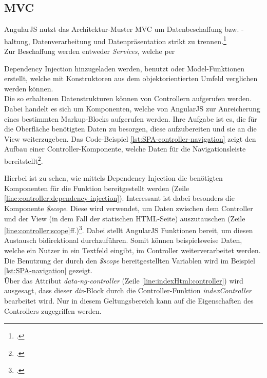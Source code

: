 \subsection{MVC}
\label{ssec:SPA-MVC}
AngularJS nutzt das Architektur-Muster \ac{MVC} um Datenbeschaffung bzw. -haltung, Datenverarbeitung und Datenpräsentation strikt zu trennen.\footcite[S.34]{book:AngularJs:Steyer2015} \\ 
Zur Beschaffung werden entweder \textit{Services}, welche per {Dependency Injection hinzugeladen werden, benutzt oder Model-Funktionen erstellt, welche mit Konstruktoren aus dem objektorientierten Umfeld verglichen werden können. \\
Die so erhaltenen Datenstrukturen können von Controllern aufgerufen werden. Dabei handelt es sich um Komponenten, welche von AngularJS zur Anreicherung eines bestimmten \gls{Markup}-Blocks aufgerufen werden. Ihre Aufgabe ist es, die für die Oberfläche benötigten Daten zu besorgen, diese aufzubereiten und sie an die View weiterzugeben. Das Code-Beispiel \ref{lst:SPA-controller-navigation} zeigt den Aufbau einer Controller-Komponente, welche Daten für die Navigationsleiste bereitstellt\footcite{online:angular:controller}.

Hierbei ist zu sehen, wie mittels Dependency Injection die benötigten Komponenten für die Funktion bereitgestellt werden (Zeile \ref{line:controller:dependency-injection}). Interessant ist dabei besonders die Komponente \textit{\$scope}. Diese wird verwendet, um Daten zwischen dem Controller und der View (in dem Fall der statischen HTML-Seite) auszutauschen (Zeile \ref{line:controller:scope}ff.)\footcite{online:angular:scopes}. Dabei stellt AngularJS Funktionen bereit, um diesen Austausch bidirektional durchzuführen. Somit können beispielsweise Daten, welche ein Nutzer in ein Textfeld eingibt, im Controller weiterverarbeitet werden.\\
Die Benutzung der durch den \textit{\$scope} bereitgestellten Variablen wird im Beispiel \ref{lst:SPA-navigation} gezeigt.\\

Über das Attribut \textit{data-ng-controller} (Zeile \ref{line:indexHtml:controller}) wird ausgesagt, dass dieser \textit{div}-Block durch die Controller-Funktion \textit{indexController} bearbeitet wird. Nur in diesem Geltungsbereich kann auf die Eigenschaften des Controllers zugegriffen werden. \\
}

